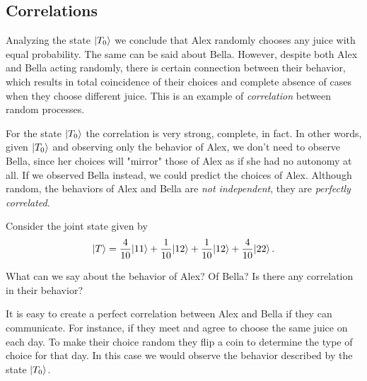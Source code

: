 \subsection{Correlations}
Analyzing the state $|{T_0}\rangle$ we conclude that Alex randomly chooses any juice with equal probability. The same can be said about Bella. However, despite both Alex and Bella acting randomly, there is certain connection between their behavior, which results in total coincidence of their choices and complete absence of cases when they choose different juice. This is an example of \emph{correlation} between random processes. 

For the state $|{T_0}\rangle$ the correlation is very strong, complete, in fact. In other words, given $|{T_0}\rangle$ and observing only the behavior of Alex, we don't need to observe Bella, since her choices will "mirror" those of Alex as if she had no autonomy at all. If we observed Bella instead, we could predict the choices of Alex. Although random, the behaviors of Alex and Bella are \emph{not independent}, they are \emph{perfectly correlated}.
\begin{exercise}
	Consider the joint state given by
	\[
	|{T}\rangle = \frac{4}{10}|{11}\rangle+\frac{1}{10}|{12}\rangle + \frac{1}{10}|{12}\rangle+\frac{4}{10}|{22}\rangle\,.
	\]
	
	What can we say about the behavior of Alex? Of Bella? Is there any correlation in their behavior?
\end{exercise}

It is easy to create a perfect correlation between Alex and Bella if they can communicate. For instance, if they meet and agree to choose the same juice on each day. To make their choice random they flip a coin to determine the type of choice for that day. In this case we would observe the behavior described by the state $|{T_0}\rangle$. 

